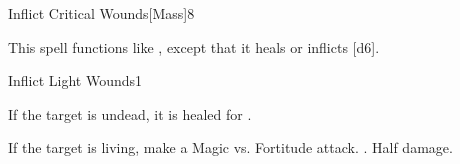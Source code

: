 \begin{spellsection}{Inflict Critical Wounds}[Mass]{8}
    \begin{spellheader}
    \end{spellheader}
    \begin{spellcontent}
        \begin{spelltargetinginfo}
        \end{spelltargetinginfo}
        \begin{spelleffects}
            \spellspecial This spell functions like , except that it heals or inflicts [d6].
        \end{spelleffects}
    \end{spellcontent}
    \begin{spellfooter}
        \miscastexplode
    \end{spellfooter}
\end{spellsection}

\begin{spellsection}{Inflict Light Wounds}{1}
    \begin{spellheader}
    \end{spellheader}
    \begin{spellcontent}
        \begin{spelltargetinginfo}
        \end{spelltargetinginfo}
        \begin{spelleffects}
            \spelleffect If the target is undead, it is healed for .
            \begin{spellattacktriggered}{If the target is living, make a Magic vs. Fortitude attack.}
                \spellsuccess {}.
                \spellfailure Half damage.
            \end{spellattacktriggered}
        \end{spelleffects}
    \end{spellcontent}
    \begin{spellfooter}
        \miscastrandom
    \end{spellfooter}
\end{spellsection}

